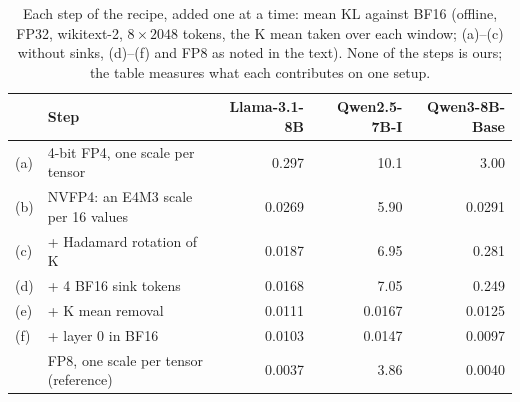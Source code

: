 \begin{table}[tbp]
\centering
\caption{Each step of the recipe, added one at a time: mean KL against BF16 (offline, FP32, wikitext-2,
$8\times2048$ tokens, the K mean taken over each window; (a)--(c) without sinks, (d)--(f) and FP8 as noted in the text). None of the steps is ours; the table measures what each
contributes on one setup.}
\label{tab:ladder}
\small
\begin{tabular}{@{}llrrr@{}}
\toprule
& Step & Llama-3.1-8B & Qwen2.5-7B-I & Qwen3-8B-Base \\
\midrule
(a) & 4-bit FP4, one scale per tensor           & 0.297  & 10.1  & 3.00 \\
(b) & NVFP4: an E4M3 scale per 16 values        & 0.0269 & 5.90  & 0.0291 \\
(c) & + Hadamard rotation of K~\cite{ashkboos2024quarot} & 0.0187 & 6.95 & 0.281 \\
(d) & + 4 BF16 sink tokens~\cite{xiao2023streamingllm,liu2024intactkv} & 0.0168 & 7.05 & 0.249 \\
(e) & + K mean removal~\cite{zhang2025sageattention,shao2026flagrot}  & 0.0111 & 0.0167 & 0.0125 \\
(f) & + layer 0 in BF16                         & 0.0103 & 0.0147 & 0.0097 \\
\midrule
    & FP8, one scale per tensor (reference)     & 0.0037 & 3.86  & 0.0040 \\
\bottomrule
\end{tabular}
\end{table}

